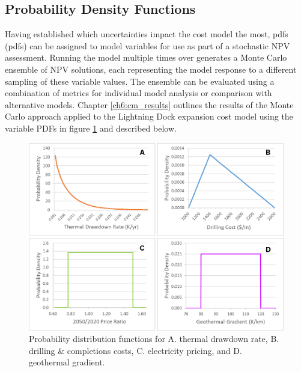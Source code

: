\subsection{Probability Density Functions}\label{ch4:pdfs}
Having established which uncertainties impact the cost model the most, \acrlong{pdf}s (\acrshort{pdf}s) can be assigned to model variables for use as part of a stochastic NPV assessment. Running the model multiple times over generates a Monte Carlo ensemble of NPV solutions, each representing the model response to a different sampling of these variable values. The ensemble can be evaluated using a combination of metrics for individual model analysis or comparison with alternative models. Chapter \ref{ch6:cm_results} outlines the results of the Monte Carlo approach applied to the Lightning Dock expansion cost model using the variable PDFs in figure \ref{fig:cm_probdists} and described below.

\begin{figure}[htp]
\centering
\includegraphics[width=.85\textwidth]{templates/images/Figure-ProbDists.png}
\singlespacing
\caption[Cost model probability distributions]{Probability distribution functions for A. thermal drawdown rate, B. drilling \& completions costs, C. electricity pricing, and D. geothermal gradient.}
\label{fig:cm_probdists}
\end{figure}

